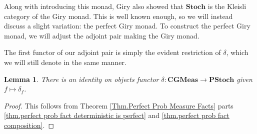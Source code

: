 \documentclass[11pt]{amsart}
\newcommand{\cat}[1]{\mathbf{#1}}
\newcommand{\from}{\colon}
\newtheorem{lem}[thm]{Lemma}
\theoremstyle{remark}
\theoremstyle{definition}
\begin{document}
Along with introducing this monad, Giry \cite{Giry_GiryMonad} also showed that $\cat{Stoch}$ is the Kleisli category of the Giry monad. This is well known enough, so we will instead discuss a slight variation: the perfect Giry monad. To construct the perfect Giry monad, we will adjust the adjoint pair making the Giry monad.

The first functor of our adjoint pair is simply the evident restriction of $\delta$, which we will still denote in the same manner. 

\begin{lem}
	There is an identity on objects functor $\delta \from \cat{CGMeas} \to \cat{PStoch}$ given $f \mapsto \delta_f$.
\end{lem} 
\begin{proof}
	This follows from Theorem \ref{Thm.Perfect Prob Measure Facts} parts \ref{thm.perfect prob fact deterministic is perfect} and \ref{thm.perfect prob fact composition}.
\end{proof}
\end{document}
